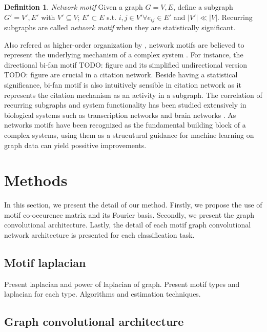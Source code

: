 \documentclass{article}
\theoremstyle{definition}
\newtheorem{definition}{Definition}[section]
\begin{document}
\begin{definition}{\emph{Network motif}}
Given a graph $G = {V,E}$, define a subgraph $G' = {V', E'}$ with $V' \subseteq V$;
$E' \subset E$ s.t. $i,j \in V' \forall e_{ij} \in E'$ and $|V'| \ll |V|$. Recurring subgraphs
are called \emph{network motif} when they are statistically significant.
\end{definition}

Also refered as higher-order organization by \citeauthor{juremotif}, network motifs
are believed to represent the underlying mechanism of a complex system \cite{netmotif,alon2006introduction,mangan2003structure}. 
For instance, the directional bi-fan motif TODO: figure
and its simplified undirectional version TODO: figure are crucial in a citation network. 
Beside having a statistical significance, bi-fan motif is also intuitively 
sensible in citation network as it represents the citation mechanism as an activity
in a subgraph. The correlation of recurring subgraphs and system functionality has 
been studied extensively in biological systems such as 
transcription networks \cite{mangan2003structure} and brain 
networks \cite{brainnetheuvel,honey2007network}. As networks motifs
have been recognized as the fundamental building block of a complex
systems, using them as a strucutural guidance for machine learning
on graph data can yield possitive improvements.

\section{Methods}

In this section, we present the detail of our method. Firstly,
we propose the use of motif co-occurence matrix and its Fourier basis.
Secondly, we present the graph convolutional architecture. Lastly, the
detail of each motif graph convolutional network architecture is
presented for each classification task.

\subsection{Motif laplacian}

Present laplacian and power of laplacian of graph.
Present motif types and laplacian for each type.
Algorithms and estimation techniques.

\subsection{Graph convolutional architecture}
\end{document}
